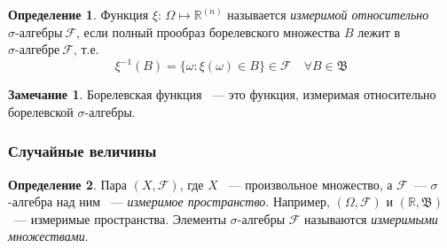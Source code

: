 \documentclass[oneside,final,14pt]{extreport}
\theoremstyle{plain}
\theoremstyle{definition}
\newtheorem*{defn}{Определение}
\newtheorem*{rmrk}{Замечание}
\theoremstyle{named}
\begin{document}
\begin{defn}
    Функция $\xi$: $\Omega \mapsto \mathbb{R}^{(n)}$ называется {\it измеримой относительно $\sigma\text{-алгебры} \: \mathcal{F}$}, если полный прообраз борелевского множества $B$ лежит в $\sigma\text{-алгебре} \: \mathcal{F}$, т.е. 
    \begin{equation*}
        \xi^{-1}(B) = \{\omega \colon \xi(\omega) \in B \} \in \mathcal{F} \quad \forall B \in \mathfrak{B}
    \end{equation*}
\end{defn}

\begin{rmrk}
    Борелевская функция ~--- это функция, измеримая относительно борелевской ${\sigma \text{-алгебры}}$.
\end{rmrk}

\subsubsection{Случайные величины}
\begin{defn}
    Пара $(X, \mathcal{F})$, где $X$ ~--- произвольное множество, а $\mathcal{F}$~--- $\sigma$-алгебра над ним ~--- {\it измеримое пространство}. Например, $(\Omega, \mathcal{F})$ и $(\mathbb{R}, \mathfrak{B})$~--- измеримые пространства. Элементы $\sigma$-алгебры $\mathcal{F}$ называются {\it измеримыми множествами}.
\end{defn}
\end{document}
